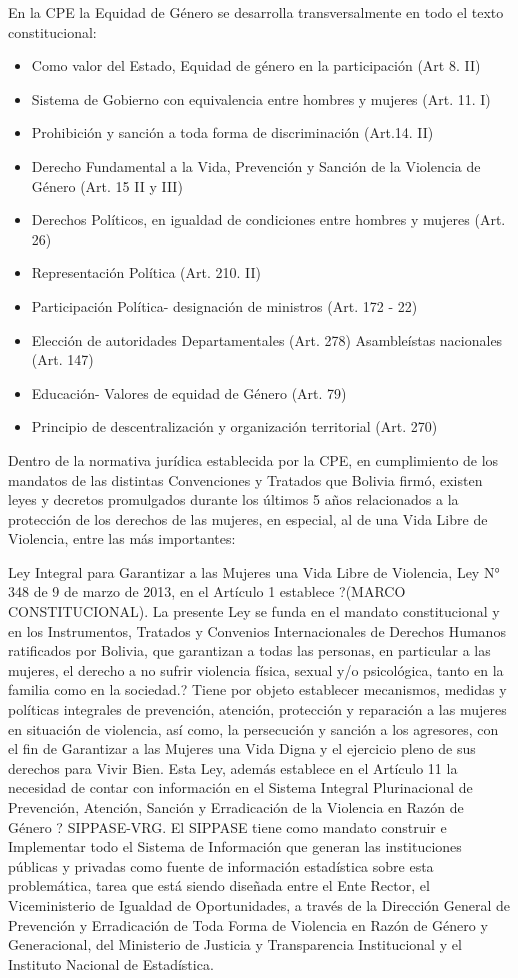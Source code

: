\documentclass[11pt,letter]{article}
\begin{document}
En la CPE la Equidad de Género se desarrolla transversalmente en todo el texto constitucional:
\begin{itemize}
\item Como valor del Estado, Equidad de género en la participación (Art 8. II)
\item Sistema de Gobierno con equivalencia entre hombres y mujeres (Art. 11. I)
\item Prohibición y sanción a toda forma de discriminación (Art.14. II)
\item Derecho Fundamental a la Vida, Prevención y Sanción de la Violencia de Género (Art. 15 II y III)
\item Derechos Políticos, en igualdad de condiciones entre hombres y mujeres (Art. 26)
\item Representación Política (Art. 210. II)
\item Participación Política- designación de ministros (Art. 172 - 22)
\item Elección de autoridades Departamentales (Art. 278) Asambleístas nacionales (Art. 147)
\item Educación- Valores de equidad de Género (Art. 79)
\item Principio de descentralización y organización territorial (Art. 270)
\end{itemize}
 
Dentro de la normativa jurídica establecida por la CPE, en cumplimiento de los mandatos de las distintas Convenciones y Tratados que Bolivia firmó, existen leyes y decretos promulgados durante los últimos 5 años relacionados a la protección de los derechos de las mujeres, en especial, al de una Vida Libre de Violencia, entre las más importantes:

Ley Integral para Garantizar a las Mujeres una Vida Libre de Violencia, Ley N° 348 de 9 de marzo de 2013, en el Artículo 1 establece ?(MARCO CONSTITUCIONAL). La presente Ley se funda en el mandato constitucional y en los Instrumentos, Tratados y Convenios Internacionales de Derechos Humanos ratificados por Bolivia, que garantizan a todas las personas, en particular a las mujeres, el derecho a no sufrir violencia física, sexual y/o psicológica, tanto en la familia como en la sociedad.?
Tiene por objeto establecer mecanismos, medidas y políticas integrales de prevención, atención, protección y reparación a las mujeres en situación de violencia, así como, la persecución y sanción a los agresores, con el fin de Garantizar a las Mujeres una Vida Digna y el ejercicio pleno de sus derechos para Vivir Bien.
Esta Ley, además establece en el Artículo 11 la necesidad de contar con información en el Sistema Integral Plurinacional de Prevención, Atención, Sanción y Erradicación de la Violencia en Razón de Género ? SIPPASE-VRG.
El SIPPASE tiene como mandato construir e Implementar todo el Sistema de Información que generan las instituciones públicas y privadas como fuente de información estadística sobre esta problemática, tarea que está siendo diseñada entre el Ente Rector, el Viceministerio de Igualdad de Oportunidades, a través de la Dirección General de Prevención y Erradicación de Toda Forma de Violencia en Razón de Género y Generacional, del Ministerio de Justicia y Transparencia Institucional y el
Instituto Nacional de Estadística.
\end{document}
